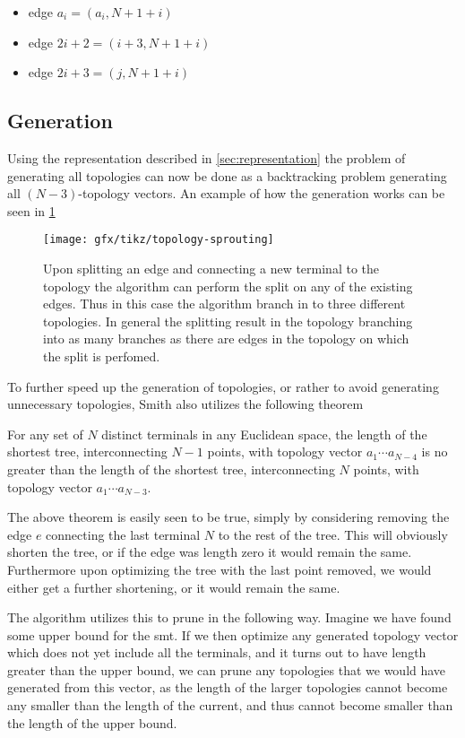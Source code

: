 \begin{itemize}
\item edge $a_{i} = (a_{i},N+1+i)$
\item edge $ 2i + 2 = (i+3,N+1+i)$
\item edge $ 2i + 3 = (j,N+1+i)$
\end{itemize}

\subsection{Generation}
\label{sec:generation}

Using the representation described in \cref{sec:representation} the problem of
generating all topologies can now be done as a backtracking problem generating
all $(N-3)$-topology vectors.  An example of how the generation works can be seen
in \cref{fig:topology-sprouting}

\begin{figure}[htbp]
  \centering
  \texttt{[image: gfx/tikz/topology-sprouting]}
  \caption[Here be dragons.]{Upon splitting an edge and connecting a new
    terminal to the topology the algorithm can perform the split on any of the
    existing edges.  Thus in this case the algorithm branch in to three
    different topologies.  In general the splitting result in the topology
    branching into as many branches as there are edges in the topology on which
    the split is perfomed.\label{fig:topology-sprouting}}
\end{figure}

To further speed up the generation of topologies, or rather to avoid generating
unnecessary topologies, Smith also utilizes the following theorem
%
\begin{theorem}
  For any set of $N$ distinct terminals in any Euclidean space, the length of
  the shortest tree, interconnecting $N-1$ points, with topology vector
  $a_1 \cdots a_{N-4}$ is no greater than the length of the shortest tree,
  interconnecting $N$ points, with topology vector $a_1 \cdots a_{N-3}$.
\end{theorem}
%
The above theorem is easily seen to be true, simply by considering removing the
edge $e$ connecting the last terminal $N$ to the rest of the tree.  This will
obviously shorten the tree, or if the edge was length zero it would remain the
same.  Furthermore upon optimizing the tree with the last point removed, we
would either get a further shortening, or it would remain the same.

The algorithm utilizes this to prune in the following way.  Imagine we have
found some upper bound for the \gls{smt}.  If we then optimize any generated
topology vector which does not yet include all the terminals, and it turns out
to have length greater than the upper bound, we can prune any topologies that we
would have generated from this vector, as the length of the larger topologies
cannot become any smaller than the length of the current, and thus cannot become
smaller than the length of the upper bound.


